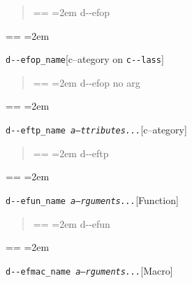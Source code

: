 \documentclass{book}
\makeatletter
\newenvironment{GNUTexinfopreformatted}{%
  \par\obeylines\obeyspaces\frenchspacing
  \parskip=\z@\parindent=\z@}{}
\makeatother
\begin{document}
%
\begin{quote}
\unskip{\parskip=0pt\noindent}%
\begin{GNUTexinfopreformatted}
\leftskip=2em\relax\ttfamily%
d{-}{-}efop
\end{GNUTexinfopreformatted}
\end{quote}
\begin{GNUTexinfopreformatted}
\leftskip=2em\relax\ttfamily%

\end{GNUTexinfopreformatted}
\noindent\texttt{d{-}{-}efop\_name}\hfill[c--ategory on \texttt{c{-}{-}lass}]

%
\begin{quote}
\unskip{\parskip=0pt\noindent}%
\begin{GNUTexinfopreformatted}
\leftskip=2em\relax\ttfamily%
d{-}{-}efop no arg
\end{GNUTexinfopreformatted}
\end{quote}
\begin{GNUTexinfopreformatted}
\leftskip=2em\relax\ttfamily%

\end{GNUTexinfopreformatted}
\noindent\texttt{d{-}{-}eftp\_name \EmbracOn{}\textnormal{\textsl{a--ttributes...}}\EmbracOff{}}\hfill[c--ategory]

%
\begin{quote}
\unskip{\parskip=0pt\noindent}%
\begin{GNUTexinfopreformatted}
\leftskip=2em\relax\ttfamily%
d{-}{-}eftp
\end{GNUTexinfopreformatted}
\end{quote}
\begin{GNUTexinfopreformatted}
\leftskip=2em\relax\ttfamily%

\end{GNUTexinfopreformatted}
\noindent\texttt{d{-}{-}efun\_name \EmbracOn{}\textnormal{\textsl{a--rguments...}}\EmbracOff{}}\hfill[Function]

%
\begin{quote}
\unskip{\parskip=0pt\noindent}%
\begin{GNUTexinfopreformatted}
\leftskip=2em\relax\ttfamily%
d{-}{-}efun
\end{GNUTexinfopreformatted}
\end{quote}
\begin{GNUTexinfopreformatted}
\leftskip=2em\relax\ttfamily%

\end{GNUTexinfopreformatted}
\noindent\texttt{d{-}{-}efmac\_name \EmbracOn{}\textnormal{\textsl{a--rguments...}}\EmbracOff{}}\hfill[Macro]
\end{document}
